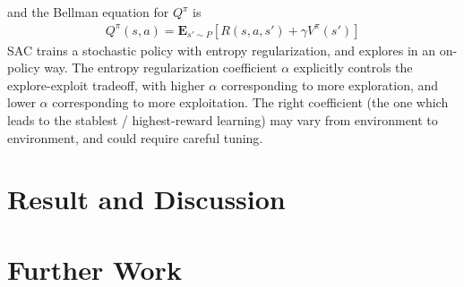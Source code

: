 \documentclass[12pt,a4paper,oneside]{book}
\theoremstyle{plain}
\numberwithin{equation}{chapter} \DeclareMathOperator{\Var}{Var}
\begin{document}
and the Bellman equation for $Q^{\pi}$ is
\begin{align*}
      Q^{\pi}(s,a)=\mathbf{E}_{s' \sim P}[R(s,a,s')+\gamma V^{\pi}(s')]
\end{align*}
SAC trains a stochastic policy with entropy regularization, and explores in an on-policy way. The entropy regularization coefficient $\alpha$ explicitly controls the explore-exploit tradeoff, with higher $\alpha$ corresponding to more exploration, and lower $\alpha$ corresponding to more exploitation. The right coefficient (the one which leads to the stablest / highest-reward learning) may vary from environment to environment, and could require careful tuning.


\chapter{Result and Discussion}


\chapter{Further Work}
\end{document}
